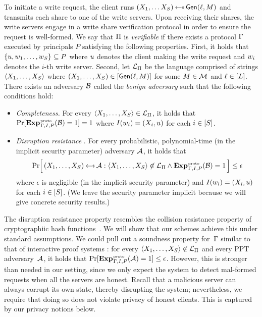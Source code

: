 To initiate a write request, the client runs $(X_1, \ldots X_\sharect) \getsr
\gen(\idx,\msg)$ and transmits each share to one of the write servers. Upon
receiving their shares, the write servers engage in a write share verification
protocol in order to ensure the request is well-formed.  We say that $\mathrm{\Pi}$ is
\emph{verifiable} if there exists a protocol $\mathrm{\Gamma}$ executed by principals
$P$ satisfying the following properties.
%
First, it holds that $\{u, w_1, \ldots, w_{S}\}
\subseteq P$ where $u$ denotes the client making the write request and
$w_i$ denotes the $i$-th write server.
%
Second, let $\mathcal{L}_{\mathrm{\Pi}}$ be the language comprised of strings $\langle X_1, \ldots, X_S \rangle$
where $(X_1, \ldots, X_S) \in [\mathsf{Gen}(\ell, M)]$ for some $M \in \mathcal{M}$ and $\ell
\in [L]$. There exists an adversary $\mathcal{B}$ called the \textit{benign adversary}
such that the following conditions hold:
\begin{itemize}
  \item \textit{Completeness.}
    For every $\langle X_1, \ldots, X_S \rangle \in \mathcal{L}_{\mathrm{\Pi}}$, it holds that
    $
      \Pr[\game{proto}_{\reqvfy,I,P}(\advB) \outputs \accept] = 1
    $
  where $I(w_i) = (X_i, u)$ for each $i\in[S]$.
  \item \textit{Disruption resistance} \cite[def. 3]{riposte}.
    For every probabilistic, polynomial-time (in the implicit security
    parameter) adversary $\mathcal{A}$, it holds that
    \[
      \Prob{ (\shares) \getsr \advA:
             \str{X_1, \ldots, X_\sharect} \not\in \lang_\dpf \AND
             \game{proto}_{\reqvfy,I,P}(\advB) \outputs \accept } \le \epsilon
    \]
    where $\epsilon$ is negligible (in the implicit security parameter) and
    $I(w_i) = (X_i, u)$ for each $i\in[S]$. (We leave the
    security parameter implicit because we will give concrete security results.)
\end{itemize}

The disruption resistance property resembles the collision resistance property
of cryptographiic hash functions~\cite{collision-resistance}. We will show that
our schemes achieve this under standard assumptions.
%
We could pull out a soundness property for~$\mathrm{\Gamma}$ similar to
that of interactive proof systems \cite[def. 4.2.10]{oded}: for every
$\langle X_1, \ldots, X_S \rangle \not\in \mathcal{L}_{\mathrm{\Pi}}$ and every PPT adversary~$\mathcal{A}$, it
holds that $\Pr[\game{proto}_{\reqvfy,I,P}(\advA) = 1] \le \epsilon$.
%
However, this is stronger than needed in our setting, since we only expect the
system to detect mal-formed requests when all the servers are honest.  Recall
that a malicious server can always corrupt its own state, thereby disrupting the
system; nevertheless, we require that doing so does not violate privacy of
honest clients. This is captured by our privacy notions below.

